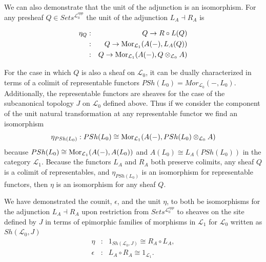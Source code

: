 \documentclass[aps,twocolumn]{revtex4-1}
\begin{document}
We can also demonstrate that the unit of the adjunction is an isomorphism. For any presheaf $Q \in Sets^{\mathcal{L}_0^{opp}}$ the unit of the adjunction $L_A \dashv R_A$ is

\begin{eqnarray*}
\eta_{Q} &:& Q \rightarrow R \circ L(Q)\\
&:& Q \rightarrow \mathop{\rm Mor}\nolimits_{\mathcal{L}_1}(A(-),L_A(Q))\\
&:& Q \rightarrow \mathop{\rm Mor}\nolimits_{\mathcal{L}_1}(A(-), Q \otimes_{\mathcal{L}_0} A)
\end{eqnarray*}

For the case in which $Q$ is also a sheaf on $\mathcal{L}_0$, it can be dually characterized in terms of a colimit of representable functors $PSh(L_0) = Mor_{\mathcal{L}_0}(-,L_0)$. Additionally, the representable functors are sheaves for the case of the subcanonical topology $J$ on $\mathcal{L}_0$ defined above. Thus if we consider the component of the unit natural transformation at any representable functor we find an isomorphism
$$
\eta_{PSh(L_0)}: PSh(L_0) \cong \mathop{\rm Mor}\nolimits_{\mathcal{L}_1}(A(-), PSh(L_0) \otimes_{\mathcal{L}_0} A)
$$
because $PSh(L_0) \cong \mathop{\rm Mor}\nolimits_{\mathcal{L}_1}(A(-), A(L_0))$ and $A(L_0) \cong L_A(PSh(L_0))$ in the category $\mathcal{L}_1$. Because the functors $L_A$ and $R_A$ both preserve colimits, any sheaf $Q$ is a colimit of representables, and $\eta_{PSh(L_0)}$ is an isomorphism for representable functors, then $\eta$ is an isomorphism for any sheaf $Q$.

We have demonstrated the counit, $\epsilon$, and the unit $\eta$, to both be isomorphisms for the adjunction $L_A \dashv R_A$ upon restriction from $Sets^{\mathcal{L}_0^{opp}}$ to sheaves on the site defined by $J$ in terms of epimorphic families of morphisms in $\mathcal{L}_1$ for $\mathcal{L}_0$ written as $Sh(\mathcal{L}_0,J)$
\begin{eqnarray*}
\eta &:& 1_{Sh(\mathcal{L}_0,J)} \cong R_A \circ L_A,\\
\epsilon &:& L_A \circ R_A \cong 1_{\mathcal{L}_1}.
\end{eqnarray*}
\end{document}
